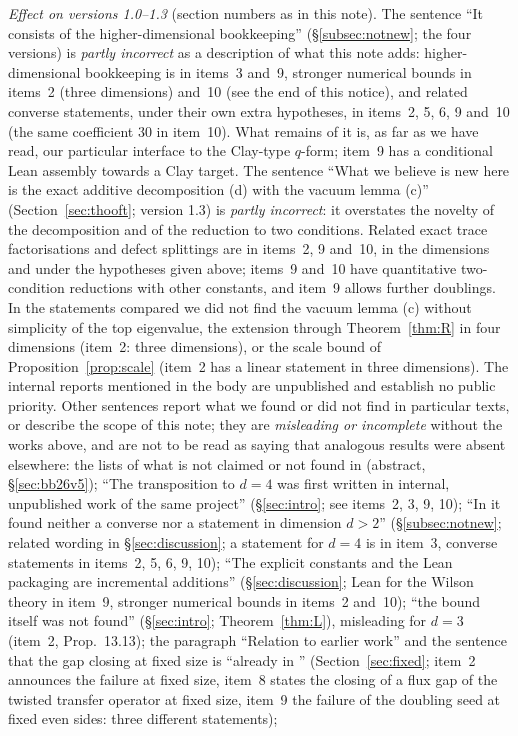 \documentclass[11pt,a4paper]{article}
\theoremstyle{plain}
\theoremstyle{definition}
\theoremstyle{remark}
\numberwithin{equation}{section}
\begin{document}
\par\medskip\noindent\textit{Effect on versions 1.0--1.3} (section numbers as in this note).
 The sentence ``It consists of the higher-dimensional bookkeeping'' (\S\ref{subsec:notnew}; the four versions) is \emph{partly incorrect} as a description of what this note adds: higher-dimensional bookkeeping is in items~3 and~9, stronger numerical bounds in items~2 (three dimensions) and~10 (see the end of this notice), and related converse statements, under their own extra hypotheses, in items~2, 5, 6, 9 and~10 (the same coefficient $30$ in item~10). What remains of it is, as far as we have read, our particular interface to the Clay-type $q$-form; item~9 has a conditional Lean assembly towards a Clay target.
 The sentence ``What we believe is new here is the exact additive decomposition (d) with the vacuum lemma (c)'' (Section~\ref{sec:thooft}; version 1.3) is \emph{partly incorrect}: it overstates the novelty of the decomposition and of the reduction to two conditions. Related exact trace factorisations and defect splittings are in items~2, 9 and~10, in the dimensions and under the hypotheses given above; items~9 and~10 have quantitative two-condition reductions with other constants, and item~9 allows further doublings. In the statements compared we did not find the vacuum lemma (c) without simplicity of the top eigenvalue, the extension through Theorem~\ref{thm:R} in four dimensions (item~2: three dimensions), or the scale bound of Proposition~\ref{prop:scale} (item~2 has a linear statement in three dimensions). The internal reports mentioned in the body are unpublished and establish no public priority.
 Other sentences report what we found or did not find in particular texts, or describe the scope of this note; they are \emph{misleading or incomplete} without the works above, and are not to be read as saying that analogous results were absent elsewhere: the lists of what is not claimed or not found in \cite{BB26v5} (abstract, \S\ref{sec:bb26v5}); ``The transposition to $d=4$ was first written in internal, unpublished work of the same project'' (\S\ref{sec:intro}; see items~2, 3, 9, 10); ``In \cite{OAI26} it found neither a converse nor a statement in dimension $d>2$'' (\S\ref{subsec:notnew}; related wording in \S\ref{sec:discussion}; a statement for $d=4$ is in item~3, converse statements in items~2, 5, 6, 9, 10);
``The explicit constants and the Lean packaging are incremental additions'' (\S\ref{sec:discussion}; Lean for the Wilson theory in item~9, stronger numerical bounds in items~2 and~10); ``the bound itself was not found'' (\S\ref{sec:intro}; Theorem~\ref{thm:L}), misleading for $d=3$ (item~2, Prop.~13.13); the paragraph ``Relation to earlier work'' and the sentence that the gap closing at fixed size is ``already in \cite{BB26v5}'' (Section~\ref{sec:fixed}; item~2 announces the failure at fixed size, item~8 states the closing of a flux gap of the twisted transfer operator at fixed size, item~9 the failure of the doubling seed at fixed even sides: three different statements);
\end{document}
